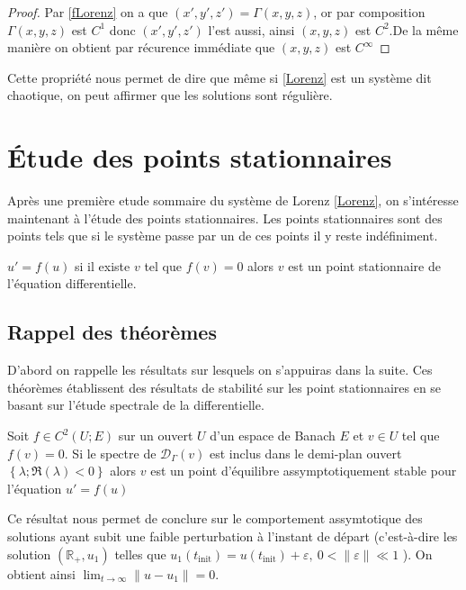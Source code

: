 \documentclass{article}
\newcommand{\R}{\mathbb{R}}
\newcommand{\cad}{c'est-\`a-dire }
\newtheorem[M]{prop}{Proposition}[section]
\newtheorem[M]{propt}{Propriété}[section]
\newtheorem[L]{thm}{Théoreme}
\newtheorem[L]{cor}{Corollaire}
\begin{document}
\begin{proof}
    Par \eqref{fLorenz} on a que $(x',y',z') = \Gamma(x,y,z)$, or par composition $\Gamma(x,y,z)$ est $C^1$ donc $(x',y',z')$ l'est aussi, ainsi $(x,y,z)$ est $C^2$.De la même manière on obtient par récurence immédiate que $(x,y,z)$ est $C^\infty$
\end{proof}

Cette propriété nous permet de dire que même si \eqref{Lorenz} est un système dit chaotique, on peut affirmer que les solutions sont régulière.

\section{\'Etude des points stationnaires}
Après une première etude sommaire du système de Lorenz \eqref{Lorenz}, on s'intéresse maintenant à l'étude des points stationnaires. Les points stationnaires sont des points tels que si le système passe par un de ces points il y reste indéfiniment.

\begin{thm}
    $u' = f(u)$ si il existe $v$ tel que $f(v)=0$ alors $v$ est un point stationnaire de l'équation differentielle.
\end{thm}

\subsection{Rappel des théorèmes}
\label{sec:Rappel-des-théorèmes}
D'abord on rappelle les résultats sur lesquels on s'appuiras dans la suite. Ces théorèmes établissent des résultats de stabilité sur les point stationnaires en se basant sur l'étude spectrale de la differentielle.
\begin{thm}
    \label{thm:eq-ass-stable}
    Soit $f\in C^2(U;E)$ sur un ouvert $U$ d'un espace de Banach $E$ et $v\in U$ tel que $f(v)=0$. Si le spectre de $\mathcal{D}_\Gamma(v)$ est inclus dans le demi-plan ouvert $\left\{\lambda; \Re(\lambda)<0\right\}$ alors $v$ est un point d'équilibre assymptotiquement stable pour l'équation $u'=f(u)$
\end{thm}

Ce résultat nous permet de conclure sur le comportement assymtotique des solutions ayant subit une faible perturbation à l'instant de départ (\cad les solution $(\R_+,u_1)$ telles que $u_1(t_{\text{init}})=u(t_{\text{init}})+\varepsilon,\ 0<\|\varepsilon\|\ll 1 $ ). On obtient ainsi $\lim_{t\to\infty}\|u-u_1\| = 0$.
\end{document}

